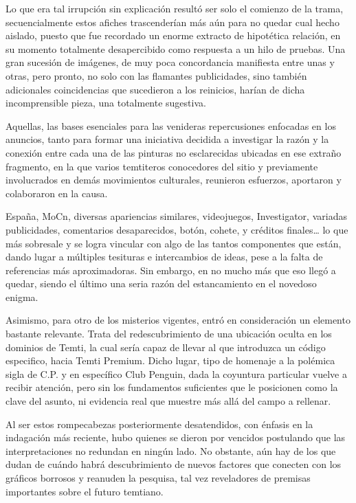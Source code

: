 \documentclass[
]{book}
\begin{document}
Lo que era tal irrupción sin explicación resultó ser solo el comienzo de la trama, secuencialmente estos afiches trascenderían más aún para no quedar cual hecho aislado, puesto que fue recordado un enorme extracto de hipotética relación, en su momento totalmente desapercibido como respuesta a un hilo de pruebas. Una gran sucesión de imágenes, de muy poca concordancia manifiesta entre unas y otras, pero pronto, no solo con las flamantes publicidades, sino también adicionales coincidencias que sucedieron a los reinicios, harían de dicha incomprensible pieza, una totalmente sugestiva.

Aquellas, las bases esenciales para las venideras repercusiones enfocadas en los anuncios, tanto para formar una iniciativa decidida a investigar la razón y la conexión entre cada una de las pinturas no esclarecidas ubicadas en ese extraño fragmento, en la que varios temtiteros conocedores del sitio y previamente involucrados en demás movimientos culturales, reunieron esfuerzos, aportaron y colaboraron en la causa.

España, MoCn, diversas apariencias similares, videojuegos, Investigator, variadas publicidades, comentarios desaparecidos, botón, cohete, y créditos finales\ldots{} lo que más sobresale y se logra vincular con algo de las tantos componentes que están, dando lugar a múltiples tesituras e intercambios de ideas, pese a la falta de referencias más aproximadoras. Sin embargo, en no mucho más que eso llegó a quedar, siendo el último una seria razón del estancamiento en el novedoso enigma.

Asimismo, para otro de los misterios vigentes, entró en consideración un elemento bastante relevante. Trata del redescubrimiento de una ubicación oculta en los dominios de Temti, la cual sería capaz de llevar al que introduzca un código especifico, hacia Temti Premium. Dicho lugar, tipo de homenaje a la polémica sigla de C.P. y en específico Club Penguin, dada la coyuntura particular vuelve a recibir atención, pero sin los fundamentos suficientes que le posicionen como la clave del asunto, ni evidencia real que muestre más allá del campo a rellenar.

Al ser estos rompecabezas posteriormente desatendidos, con énfasis en la indagación más reciente, hubo quienes se dieron por vencidos postulando que las interpretaciones no redundan en ningún lado. No obstante, aún hay de los que dudan de cuándo habrá descubrimiento de nuevos factores que conecten con los gráficos borrosos y reanuden la pesquisa, tal vez reveladores de premisas importantes sobre el futuro temtiano.
\end{document}
